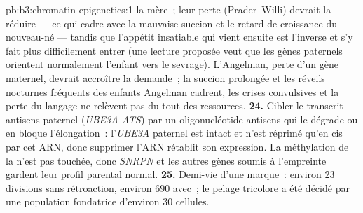 \begin{solution}{pb:b3:chromatin-epigenetics:1}
la mère~; leur perte (Prader--Willi) devrait la réduire --- ce qui
cadre avec la mauvaise succion et le retard de croissance du
nouveau-né --- tandis que l'appétit insatiable qui vient ensuite est
l'inverse et s'y fait plus difficilement entrer (une lecture proposée
veut que les gènes paternels orientent normalement l'enfant vers le
sevrage). L'Angelman, perte d'un gène maternel, devrait accroître la
demande~; la succion prolongée et les réveils nocturnes fréquents des
enfants Angelman cadrent, les crises convulsives et la perte du langage
ne relèvent pas du tout des ressources.
\textbf{24.} Cibler le transcrit antisens paternel
(\emph{UBE3A-ATS}) par un oligonucléotide antisens qui le dégrade ou en
bloque l'élongation~: l'\emph{UBE3A} paternel est intact et n'est
réprimé qu'en cis par cet ARN, donc supprimer l'ARN rétablit son
expression. La méthylation de la 
n'est pas touchée, donc \emph{SNRPN} et les autres gènes soumis à
l'empreinte gardent leur profil parental normal.
\textbf{25.} Demi-vie d'une marque~: environ $23$ divisions sans
rétroaction, environ $690$ avec~; le pelage tricolore a été décidé par
une population fondatrice d'environ $30$ cellules.
\end{solution}
